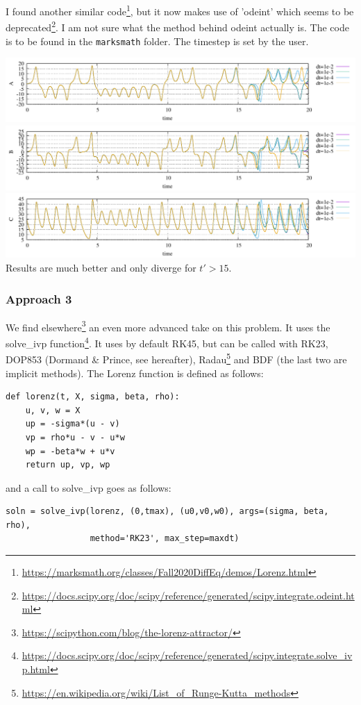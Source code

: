 I found another similar code\footnote{\url{https://marksmath.org/classes/Fall2020DiffEq/demos/Lorenz.html}}, 
but it now makes use of 'odeint' which seems to be 
deprecated\footnote{\url{https://docs.scipy.org/doc/scipy/reference/generated/scipy.integrate.odeint.html}}.
I am not sure what the method behind odeint actually is.
The code is to be found in the {\tt marksmath} folder. The timestep is set by the user.

\begin{center}
\includegraphics[width=16cm]{python_codes/fieldstone_156/marksmath/A.pdf}\\
\includegraphics[width=16cm]{python_codes/fieldstone_156/marksmath/B.pdf}\\
\includegraphics[width=16cm]{python_codes/fieldstone_156/marksmath/C.pdf}\\
{\captionfont Results are much better and only diverge for $t'>15$.}
\end{center}

\subsubsection*{Approach 3}

We find elsewhere\footnote{\url{https://scipython.com/blog/the-lorenz-attractor/}} 
an even more advanced take on this problem.
It uses the {\python solve\_ivp} 
function\footnote{\url{https://docs.scipy.org/doc/scipy/reference/generated/scipy.integrate.solve_ivp.html}}.
It uses by default RK45, but can be called with RK23, DOP853 (Dormand \& Prince, see hereafter), 
Radau\footnote{\url{https://en.wikipedia.org/wiki/List_of_Runge-Kutta_methods}} and BDF (the last two are implicit 
methods).
The Lorenz function is defined as follows:
\begin{lstlisting}
def lorenz(t, X, sigma, beta, rho):
    u, v, w = X
    up = -sigma*(u - v)
    vp = rho*u - v - u*w
    wp = -beta*w + u*v
    return up, vp, wp
\end{lstlisting}
and a call to {\python solve\_ivp} goes as follows:
\begin{lstlisting}
soln = solve_ivp(lorenz, (0,tmax), (u0,v0,w0), args=(sigma, beta, rho),
                 method='RK23', max_step=maxdt)
\end{lstlisting}

